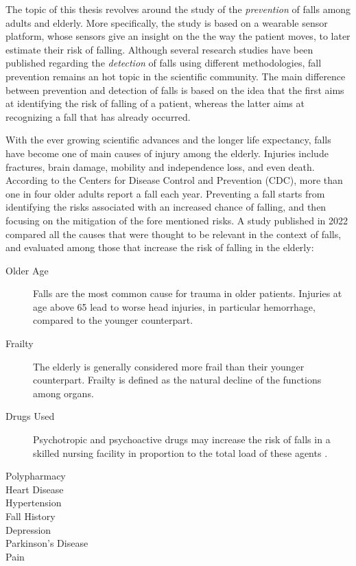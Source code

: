 
The topic of this thesis revolves around the study of the \textit{prevention} of falls among adults and elderly. More specifically, the study is based on a wearable sensor platform, whose sensors give an insight on the the way the patient moves, to later estimate their risk of falling. 
Although several research studies have been published regarding the \textit{detection} of falls using different methodologies, fall prevention remains an hot topic in the scientific community. The main difference between prevention and detection of falls is based on the idea that the first aims at identifying the risk of falling of a patient, whereas the latter aims at recognizing a fall that has already occurred.

With the ever growing scientific advances and the longer life expectancy, falls have become one of main causes of injury among the elderly. 
Injuries include fractures, brain damage, mobility and independence loss, and even death. According to the Centers for Disease Control and Prevention (CDC), more than one in four older adults report a fall each year. Preventing a fall starts from identifying the risks associated with an increased chance of falling, and then focusing on the mitigation of the fore mentioned risks.
A study published in 2022 \cite{RiskFactors} compared all the causes that were thought to be relevant in the context of falls, and evaluated among those that increase the risk of falling in the elderly:
\begin{description}
   \item[Older Age] Falls are the most common cause for trauma in older patients. Injuries at age above 65 lead to worse head injuries, in particular hemorrhage, compared to the younger counterpart\cite{geriatricTrauma}.
   \item[Frailty] The elderly is generally considered more frail than their younger counterpart. Frailty is defined as the natural decline of the functions among organs\cite{geriatricTrauma}.
   \item[Drugs Used] Psychotropic and psychoactive drugs may increase the risk of falls in a skilled nursing facility in proportion to the total load of these agents \cite{drugsEffects}.
   \item[Polypharmacy]
   \item[Heart Disease]
   \item[Hypertension]
   \item[Fall History]
   \item[Depression]
   \item[Parkinson's Disease]
   \item[Pain]
\end{description}

